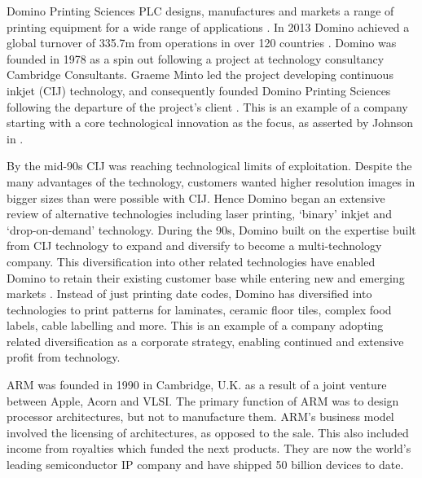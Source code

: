  \label{Sect1}

Domino Printing Sciences PLC designs, manufactures and markets a range of printing equipment for a wide range of applications \cite{DominoAnnual}. 
In 2013 Domino achieved a global turnover of \textsterling335.7m from operations in over 120 countries \cite{DominoFactsheet}. 
Domino was founded in 1978 \cite{DominoFactsheet} as a spin out following a project at technology consultancy Cambridge Consultants.
Graeme Minto led the project developing continuous inkjet (CIJ) technology, and consequently founded Domino Printing Sciences following the departure of the project's client \cite{goffin2010innovation}.
This is an example of a company starting with a core technological innovation as the focus, as asserted by Johnson in \cite{ johnson2008exploring}.

By the mid-90s CIJ was reaching technological limits of exploitation. 
Despite the many advantages of the technology, customers wanted higher resolution images in bigger sizes than were possible with CIJ. Hence Domino began an extensive review of alternative technologies including laser printing, `binary' inkjet and `drop-on-demand' technology.
During the 90s, Domino built on the expertise built from CIJ technology to expand and diversify to become a multi-technology company. 
This diversification into other related technologies have enabled Domino to retain their existing customer base while entering new and emerging markets \cite{goffin2010innovation}.
Instead of just printing date codes, Domino has diversified into technologies to print patterns for laminates, ceramic floor tiles, complex food labels, cable labelling and more.
This is an example of a company adopting related diversification as a corporate strategy, enabling continued and extensive profit from technology.

ARM was founded in 1990 in Cambridge, U.K. as a result of a joint venture between Apple, Acorn and VLSI.
The primary function of ARM was to design processor architectures, but not to manufacture them.
ARM's business model involved the licensing of architectures, as opposed to the sale. 
This also included income from royalties which funded the next products.
They are now the world's leading semiconductor IP company and have shipped 50 billion devices to date.

